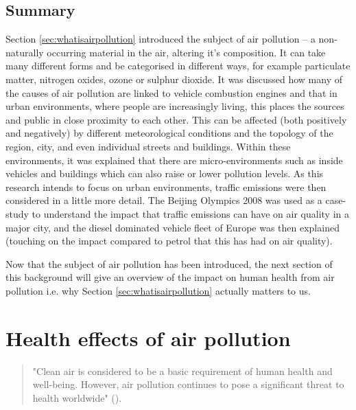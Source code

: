 \subsection{Summary}
\label{subsec:whatissummary}

Section \ref{sec:whatisairpollution} introduced the subject of air pollution -- a non-naturally occurring material in the air, altering it's composition. It can take many different forms and be categorised in different ways, for example particulate matter, nitrogen oxides, ozone or sulphur dioxide. It was discussed how many of the causes of air pollution are linked to vehicle combustion engines and that in urban environments, where people are increasingly living, this places the sources and public in close proximity to each other. This can be affected (both positively and negatively) by different meteorological conditions and the topology of the region, city, and even individual streets and buildings. Within these environments, it was explained that there are micro-environments such as inside vehicles and buildings which can also raise or lower pollution levels. As this research intends to focus on urban environments, traffic emissions were then considered in a little more detail. The Beijing Olympics 2008 was used as a case-study to understand the impact that traffic emissions can have on air quality in a major city, and the diesel dominated vehicle fleet of Europe was then explained (touching on the impact compared to petrol that this has had on air quality).

Now that the subject of air pollution has been introduced, the next section of this background will give an overview of the impact on human health from air pollution i.e. why Section \ref{sec:whatisairpollution} actually matters to us.

\newpage
\section{Health effects of air pollution}
\label{sec:healtheffects}

\begin{quote}
"Clean air is considered to be a basic requirement of human health and well-being. However, air pollution continues to pose a significant threat to health worldwide" (\cite{WorldHealthOrganisation2006}).
\end{quote}

